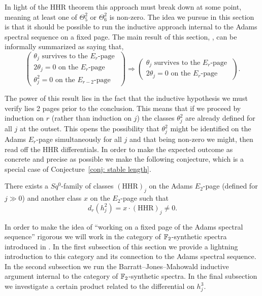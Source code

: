 In light of the HHR theorem this approach must break down at some point, meaning at least one of $\Theta_5^2$ or $\Theta_6^2$ is non-zero. The idea we pursue in this section is that it should be possible to run the inductive approach internal to the Adams spectral sequence on a fixed page. The main result of this section, , can be informally summarized as saying that,
\[ \begin{pmatrix} \theta_j \text{ survives to the } E_r \text{-page }\\ 2\theta_j = 0 \text{ on the } E_r \text{-page } \\ \theta_j^2 = 0 \text{ on the } E_{r-2} \text{-page } \end{pmatrix} \Longrightarrow \begin{pmatrix} \theta_j \text{ survives to the } E_r \text{-page }\\ 2\theta_j = 0 \text{ on the } E_r \text{-page } \end{pmatrix}. \]

The power of this result lies in the fact that the inductive hypothesis we must verify lies 2 pages prior to the conclusion. This means that if we proceed by induction on $r$ (rather than induction on $j$) the classes $\theta_j^2$ are already defined for all $j$ at the outset. This opens the possibility that $\theta_j^2$ might be identified on the Adams $E_r$-page simultaneously for all $j$ and that being non-zero we might, then read off the HHR differentials. In order to make the expected outcome as concrete and precise as possible we make the following conjecture, which is a special case of Conjecture~\ref{conj: stable length}.

\begin{cnj}
  There exists a $Sq^0$-family of classes $(\mathrm{HHR})_j$ on the Adams $E_2$-page (defined for $j \gg 0$) and another class $x$ on the $E_2$-page such that
  \[ d_r(h_j^2) = x \cdot (\mathrm{HHR})_j \neq 0. \]
\end{cnj}

In order to make the idea of ``working on a fixed page of the Adams spectral sequence'' rigorous we will work in the category of $\operatorname{\mathbb{F}}_2$-synthetic spectra introduced in \cite{Pstragowski}. In the first subsection of this section we provide a lightning introduction to this category and its connection to the Adams spectral sequence. In the second subsection we run the Barratt--Jones--Mahowald inductive argument internal to the category of $\operatorname{\mathbb{F}}_2$-synthetic spectra. In the final subsection we investigate a certain product related to the differential on $h_j^3$.

